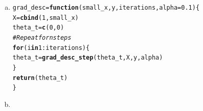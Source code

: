 \documentclass[a4paper]{article}
\makeatletter
\newcommand{\hlnum}[1]{\textcolor[rgb]{0.686,0.059,0.569}{#1}}%
\newcommand{\hlcom}[1]{\textcolor[rgb]{0.678,0.584,0.686}{\textit{#1}}}%
\newcommand{\hlopt}[1]{\textcolor[rgb]{0,0,0}{#1}}%
\newcommand{\hlstd}[1]{\textcolor[rgb]{0.345,0.345,0.345}{#1}}%
\newcommand{\hlkwa}[1]{\textcolor[rgb]{0.161,0.373,0.58}{\textbf{#1}}}%
\newcommand{\hlkwb}[1]{\textcolor[rgb]{0.69,0.353,0.396}{#1}}%
\newcommand{\hlkwc}[1]{\textcolor[rgb]{0.333,0.667,0.333}{#1}}%
\newcommand{\hlkwd}[1]{\textcolor[rgb]{0.737,0.353,0.396}{\textbf{#1}}}%
\newenvironment{kframe}{%
 \def\at@end@of@kframe{}%
 \ifinner\ifhmode%
  \def\at@end@of@kframe{\end{minipage}}%
  \begin{minipage}{\columnwidth}%
 \fi\fi%
 \def\FrameCommand##1{\hskip\@totalleftmargin \hskip-\fboxsep
 \colorbox{shadecolor}{##1}\hskip-\fboxsep
     \hskip-\linewidth \hskip-\@totalleftmargin \hskip\columnwidth}%
 \MakeFramed {\advance\hsize-\width
   \@totalleftmargin\z@ \linewidth\hsize
   \@setminipage}}%
 {\par\unskip\endMakeFramed%
 \at@end@of@kframe}
\newenvironment{knitrout}{}{} %
\makeatother
\begin{document}
{\begin{enumerate}[a)]
Note that $X$ is a matrix with $X = [1\;x]$, as
\[
f(X) = \theta X = \theta_0 1_{n} + \theta_1 x
\]

\begin{knitrout}
\color{fgcolor}\begin{kframe}
\begin{alltt}
\hlstd{small_x} \hlkwb{=} \hlkwd{c}\hlstd{(}\hlnum{0.56}\hlstd{,} \hlnum{0.22}\hlstd{,} \hlnum{1.7}\hlstd{,} \hlnum{0.63}\hlstd{,} \hlnum{0.36}\hlstd{,} \hlnum{1.2}\hlstd{)}
\hlstd{X} \hlkwb{=} \hlkwd{cbind}\hlstd{(}\hlnum{1}\hlstd{, small_x)}
\hlstd{y} \hlkwb{=} \hlkwd{c}\hlstd{(}\hlnum{160}\hlstd{,} \hlnum{150}\hlstd{,} \hlnum{175}\hlstd{,} \hlnum{185}\hlstd{,} \hlnum{165}\hlstd{,} \hlnum{170}\hlstd{)}

\hlkwd{grad_desc_step}\hlstd{(}\hlkwd{c}\hlstd{(}\hlnum{0}\hlstd{,} \hlnum{0}\hlstd{), X, y,} \hlnum{0.1}\hlstd{)}
\end{alltt}
\begin{verbatim}
##             [,1]
##         33.50000
## small_x 26.66833
\end{verbatim}
\end{kframe}
\end{knitrout}

\item

\begin{knitrout}
\color{fgcolor}\begin{kframe}
\begin{alltt}
\hlstd{grad_desc} \hlkwb{=} \hlkwa{function}\hlstd{(}\hlkwc{small_x}\hlstd{,} \hlkwc{y}\hlstd{,} \hlkwc{iterations}\hlstd{,} \hlkwc{alpha} \hlstd{=} \hlnum{0.1}\hlstd{) \{}
  \hlstd{X} \hlkwb{=} \hlkwd{cbind}\hlstd{(}\hlnum{1}\hlstd{, small_x)}
  \hlstd{theta_t} \hlkwb{=} \hlkwd{c}\hlstd{(}\hlnum{0}\hlstd{,} \hlnum{0}\hlstd{)}
  \hlcom{# Repeat for n steps}
  \hlkwa{for} \hlstd{(i} \hlkwa{in} \hlnum{1}\hlopt{:}\hlstd{iterations) \{}
    \hlstd{theta_t} \hlkwb{=} \hlkwd{grad_desc_step}\hlstd{(theta_t, X, y, alpha)}
  \hlstd{\}}
  \hlkwd{return}\hlstd{(theta_t)}
\hlstd{\}}
\end{alltt}
\end{kframe}
\end{knitrout}

\item


\end{enumerate}}
\end{document}
